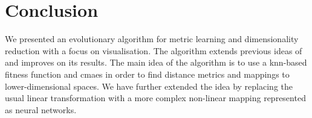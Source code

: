 
%
%
%
%
%
%









\chapter{Conclusion} \label{chap:conclusion}

We presented an evolutionary algorithm for metric learning and dimensionality reduction with a focus on visualisation. The algorithm extends previous ideas of~\citep{fukui2013evolutionary} and improves on its results. The main idea of the algorithm is to use a \ac{knn}-based fitness function and \ac{cmaes} in order to find distance metrics and mappings to lower-dimensional spaces. We have further extended the idea by replacing the usual linear transformation with a more complex non-linear mapping represented as neural networks.

